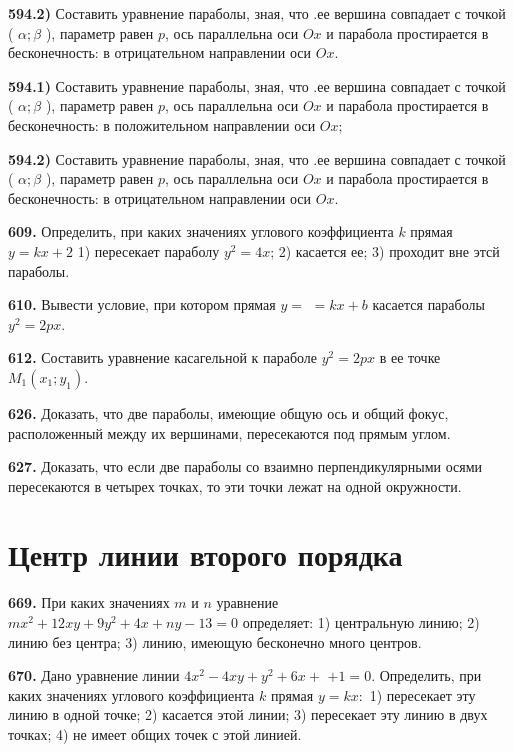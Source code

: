 \textbf{594.2)} Составить уравнение параболы, зная, что .ее вершина совпадает с точкой ( $\alpha ; \beta$ ), параметр равен $p$, ось параллельна оси $O x$ и парабола простирается в бесконечность: в отрицательном направлении оси $O x$.

\textbf{594.1)} Составить уравнение параболы, зная, что .ее вершина совпадает с точкой ( $\alpha ; \beta$ ), параметр равен $p$, ось параллельна оси $O x$ и парабола простирается в бесконечность: в положительном направлении оси $O x$;

\textbf{594.2)} Составить уравнение параболы, зная, что .ее вершина совпадает с точкой ( $\alpha ; \beta$ ), параметр равен $p$, ось параллельна оси $O x$ и парабола простирается в бесконечность: в отрицательном направлении оси $O x$.

\textbf{609.} Определить, при каких значениях углового коэффициента $k$ прямая $y=k x+2$ 1) пересекает параболу $y^2=4 x$; 2) касается ее; 3) проходит вне этсй параболы.

\textbf{610.} Вывести условие, при котором прямая $y=$ $=k x+b$ касается параболы $y^2=2 p x$.

\textbf{612.} Составить уравнение касагельной к параболе $y^2=2 p x$ в ее точке $M_1\left(x_1 ; y_1\right)$.

\textbf{626.} Доказать, что две параболы, имеющие общую ось и общий фокус, расположенный между их вершинами, пересекаются под прямым углом.

\textbf{627.} Доказать, что если две параболы со взаимно перпендикулярными осями пересекаются в четырех точках, то эти точки лежат на одной окружности.



\section{ Центр линии второго порядка }



\textbf{669.} При каких значениях $m$ и $n$ уравнение $m x^2+12 x y+9 y^2+4 x+n y-13=0$ определяет: 1) центральную линию; 2) линию без центра; 3) линию, имеющую бесконечно много центров.

\textbf{670.} Дано уравнение линии $4 x^2-4 x y+y^2+6 x+$ $+1=0$. Определить, при каких значениях углового коэффициента $k$ прямая $y=k x:$ 1) пересекает эту линию в одной точке; 2) касается этой линии; 3) пересекает эту линию в двух точках; 4) не имеет общих точек с этой линией.



